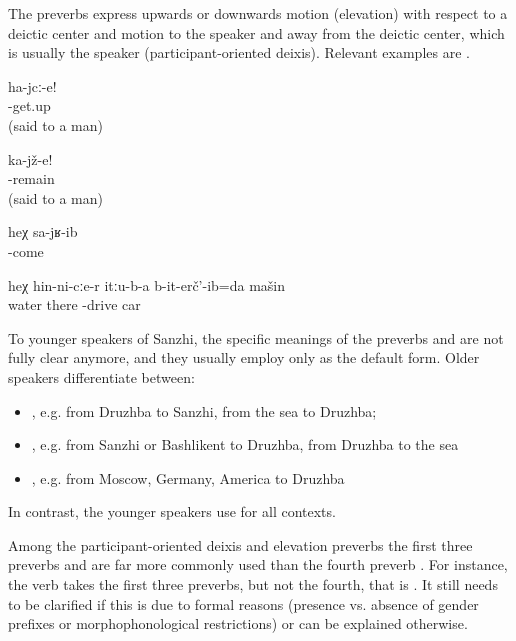 The preverbs express upwards or downwards motion (elevation) with respect to a deictic center and motion to the speaker and away from the deictic center, which is usually the speaker (participant-oriented deixis). Relevant examples are .
%
\begin{exe}
	\ex	\label{ex:Get up (said to a man) verbs}
	\gll	ha-jcː-e!\\
		-get.up\\
	\glt	{}(said to a man)

	\ex	\label{ex:Sit down (said to a man) verbs}
	\gll	ka-jž-e!\\
		-remain\\
	\glt	{} (said to a man)

	\ex	\label{ex:He came back verbs}
	\gll	heχ	sa-jʁ-ib\\
			-come\\
	\glt	{}

	\ex	\label{ex:Down through that water I drove the car verbs}
	\gll	heχ	hin-ni-cːe-r	itːu-b-a	b-it-erč'-ib=da	mašin\\
			water	there	-drive	car\\
	\glt	{}
\end{exe}

To younger speakers of Sanzhi, the specific meanings of the preverbs  and  are not fully clear anymore, and they usually employ only  as the default form. Older speakers differentiate between:
%
\begin{itemize}
	\item	{} , e.g. from Druzhba to Sanzhi, from the sea to Druzhba;
	\item	{} , e.g. from Sanzhi or Bashlikent to Druzhba, from Druzhba to the sea
	\item	{} , e.g. from Moscow, Germany, America to Druzhba
\end{itemize}
%
In contrast, the younger speakers use  for all contexts.

Among the participant-oriented deixis and elevation preverbs the first three preverbs  and  are far more commonly used than the fourth preverb . For instance, the verb  takes the first three preverbs, but not the fourth, that is . It still needs to be clarified if this is due to formal reasons (presence vs. absence of gender prefixes or morphophonological restrictions) or can be explained otherwise. 

